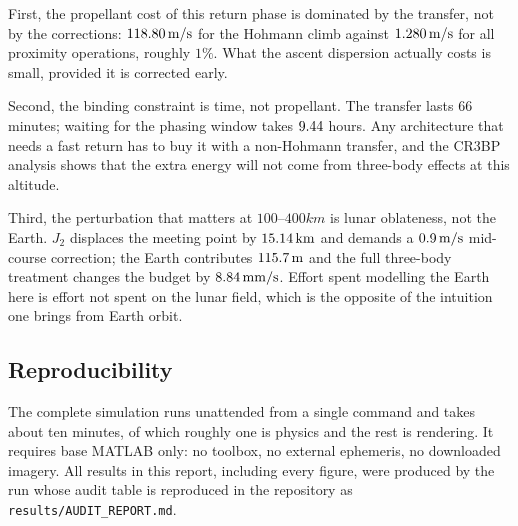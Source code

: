 First, the propellant cost of this return phase is dominated by the transfer,
not by the corrections: $118.80\,\mathrm{m/s}$ for the Hohmann climb against
$1.280\,\mathrm{m/s}$ for all proximity operations, roughly $1\%$. What the
ascent dispersion actually costs is small, provided it is corrected early.

Second, the binding constraint is time, not propellant. The transfer lasts
$66$ minutes; waiting for the phasing window takes $9.44$ hours. Any
architecture that needs a fast return has to buy it with a non-Hohmann transfer,
and the CR3BP analysis shows that the extra energy will not come from
three-body effects at this altitude.

Third, the perturbation that matters at $100$--$400\unit{km}$ is lunar
oblateness, not the Earth. $J_2$ displaces the meeting point by
$15.14\,\mathrm{km}$ and demands a $0.9\,\mathrm{m/s}$ mid-course correction;
the Earth contributes $115.7\,\mathrm{m}$ and the full three-body treatment
changes the budget by $8.84\,\mathrm{mm/s}$. Effort spent modelling the Earth
here is effort not spent on the lunar field, which is the opposite of the
intuition one brings from Earth orbit.

\subsection{Reproducibility}

The complete simulation runs unattended from a single command and takes about
ten minutes, of which roughly one is physics and the rest is rendering. It
requires base MATLAB only: no toolbox, no external ephemeris, no downloaded
imagery. All results in this report, including every figure, were produced by
the run whose audit table is reproduced in the repository as
\texttt{results/AUDIT\_REPORT.md}.
